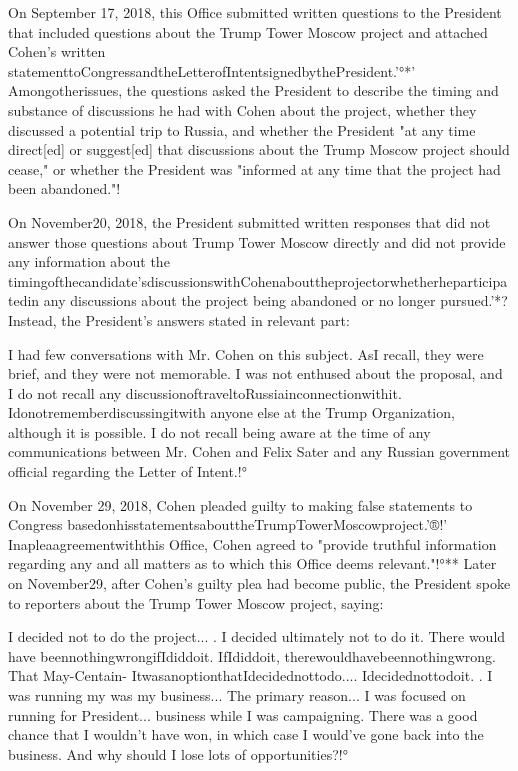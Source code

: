 On September 17, 2018, this Office submitted written questions to the President that included questions about the Trump Tower Moscow project and attached Cohen's written statementtoCongressandtheLetterofIntentsignedbythePresident.'°*'
Amongotherissues, the questions asked the President to describe the timing and substance of discussions he had with Cohen about the project, whether they discussed a potential trip to Russia, and whether the President "at any time direct[ed] or suggest[ed] that discussions about the Trump Moscow project should cease," or whether the President was "informed at any time that the project had been abandoned."!%

On November20, 2018, the President submitted written responses that did not answer those questions about Trump Tower Moscow directly and did not provide any information about the timingofthecandidate'sdiscussionswithCohenabouttheprojectorwhetherheparticipatedin any discussions about the project being abandoned or no longer pursued.'*?
Instead, the President's answers stated in relevant part:

I had few conversations with Mr. Cohen on this subject.
AsI recall, they were brief, and they were not memorable.
I was not enthused about the proposal, and I do not recall any discussionoftraveltoRussiainconnectionwithit.
Idonotrememberdiscussingitwith anyone else at the Trump Organization, although it is possible.
I do not recall being aware at the time of any communications between Mr. Cohen and Felix Sater and any Russian government official regarding the Letter of Intent.!°

On November 29, 2018, Cohen pleaded guilty to making false statements to Congress basedonhisstatementsabouttheTrumpTowerMoscowproject.'®!'
Inapleaagreementwiththis Office, Cohen agreed to "provide truthful information regarding any and all matters as to which this Office deems relevant."!°**
Later on November29, after Cohen's guilty plea had become public, the President spoke to reporters about the Trump Tower Moscow project, saying:

I decided not to do the project... .
I decided ultimately not to do it.
There would have beennothingwrongifIdiddoit.
IfIdiddoit, therewouldhavebeennothingwrong.
That
May-Centain-
ItwasanoptionthatIdecidednottodo....
Idecidednottodoit. .
I was running my
was my business...
The primary reason...
I was focused on running for President...
business while I was campaigning.
There was a good chance that I wouldn't have won, in which case I would've gone back into the business.
And why should I lose lots of opportunities?!°

